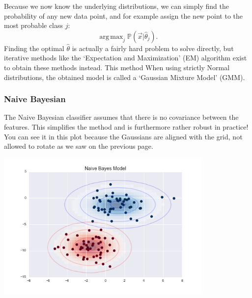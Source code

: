 \documentclass{article}
\DeclareMathOperator*{\argmax}{arg\,max}
\begin{document}
Because we now know the underlying distributions, we can simply find the probability of any new data point, and for example assign the new point to the most probable class $j$:
\begin{equation}
    \argmax_j \mathbb{P}(\vec{x}|\hat{\theta}_j).
\end{equation}
Finding the optimal $\hat{\theta}$ is actually a fairly hard problem to solve directly, but iterative methods like the `Expectation and Maximization' (EM) algorithm exist to obtain these methods instead. This method  When using strictly Normal distributions, the obtained model is called a `Gaussian Mixture Model' (GMM).

\subsubsection{Naive Bayesian}
The Naive Bayesian classifier assumes that there is no covariance between the features. This simplifies the method and is furthermore rather robust in practice! You can see it in this plot because the Gaussians are aligned with the grid, not allowed to rotate as we saw on the previous page.
\begin{center}\includegraphics[width=0.8\textwidth]{naivegaussian.png}
\end{center}
\end{document}
